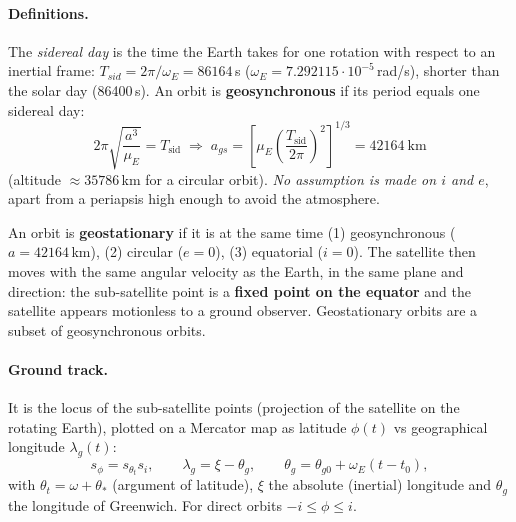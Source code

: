 \answer
\paragraph{Definitions.} The \emph{sidereal day} is the time the Earth takes for one rotation with respect to an inertial frame:
$T_{sid}=2\pi/\omega_E=86164$\,s ($\omega_E=7.292115\cdot10^{-5}$\,rad/s), shorter than the solar day (86400\,s).
An orbit is \textbf{geosynchronous} if its period equals one sidereal day:
\begin{equation}
2\pi\sqrt{\frac{a^{3}}{\mu_{E}}}=T_{\text{sid}}\;\Longrightarrow\;
a_{gs}=\left[\mu_{E}\left(\frac{T_{\text{sid}}}{2\pi}\right)^{2}\right]^{1/3}=42164\ \text{km}
\end{equation}
(altitude $\approx35786$\,km for a circular orbit). \emph{No assumption is made on $i$ and $e$}, apart from a periapsis high
enough to avoid the atmosphere.

An orbit is \textbf{geostationary} if it is at the same time (1) geosynchronous ($a=42164$\,km), (2) circular ($e=0$),
(3) equatorial ($i=0$). The satellite then moves with the same angular velocity as the Earth, in the same plane and
direction: the sub-satellite point is a \textbf{fixed point on the equator} and the satellite appears motionless to a
ground observer. Geostationary orbits are a subset of geosynchronous orbits.

\paragraph{Ground track.} It is the locus of the sub-satellite points (projection of the satellite on the rotating Earth),
plotted on a Mercator map as latitude $\phi(t)$ vs geographical longitude $\lambda_g(t)$:
\begin{equation}
s_\phi=s_{\theta_t}s_i,\qquad \lambda_g=\xi-\theta_g,\qquad \theta_g=\theta_{g0}+\omega_E(t-t_0),
\end{equation}
with $\theta_t=\omega+\theta_*$ (argument of latitude), $\xi$ the absolute (inertial) longitude and $\theta_g$ the
longitude of Greenwich. For direct orbits $-i\le\phi\le i$.

